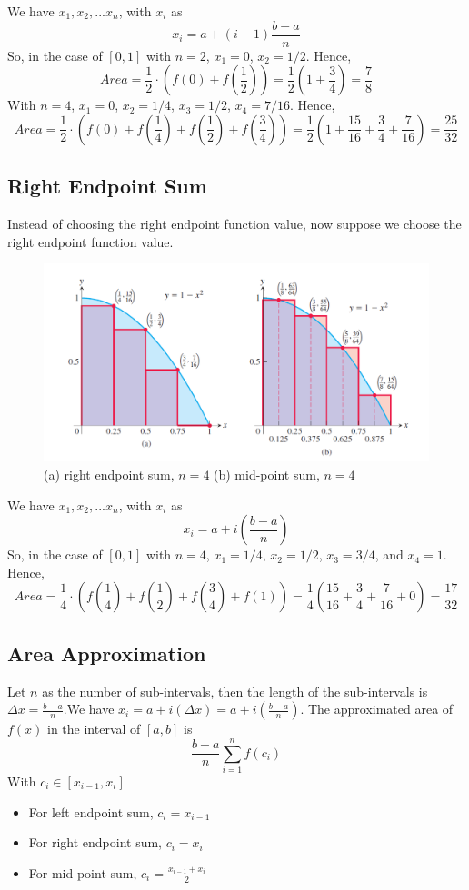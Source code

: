 \documentclass[12pt]{article}
\begin{document}
\noindent
We have $x_1, x_2, ... x_n$, with $x_i$ as 
\[
    x_i = a + (i - 1)\frac{b - a}{n} 
\]
So, in the case of $[0, 1]$ with $n = 2$, $x_1 = 0$, $x_2 = 1/2$.
Hence,
\[
    Area = \frac{1}{2} \cdot \left(f(0) + f\left(\frac{1}{2}\right)\right) = \frac{1}{2} \left(1 + \frac{3}{4}\right) = \frac{7}{8}
\]
With $n = 4$, $x_1 = 0$, $x_2 = 1/4$, $x_3 = 1/2$, $x_4 = 7/16$.
Hence,
\[
    Area = \frac{1}{2} \cdot \left(f(0) + f\left(\frac{1}{4}\right) + f\left(\frac{1}{2}\right) + f\left(\frac{3}{4}\right)\right) = \frac{1}{2} \left(1 + \frac{15}{16} + \frac{3}{4} + \frac{7}{16}\right) = \frac{25}{32}
\]

\subsection{Right Endpoint Sum}
Instead of choosing the right endpoint function value, now suppose we choose the right endpoint function value.
\begin{figure}[h!]
    \centering
    \includegraphics[width = 0.7\linewidth]{Images/right summing.png}
    \caption{(a) right endpoint sum, $n = 4$ (b) mid-point sum, $n = 4$}
\end{figure}

\noindent
We have $x_1, x_2, ... x_n$, with $x_i$ as 
\[
    x_i = a + i \left(\frac{b - a}{n} \right)
\]
So, in the case of $[0, 1]$ with $n = 4$, $x_1 = 1/4$, $x_2 = 1/2$, $x_3 = 3/4$, and $x_4 = 1$.
Hence,
\[
    Area = \frac{1}{4} \cdot \left(f\left(\frac{1}{4}\right) + f\left(\frac{1}{2}\right) + f\left(\frac{3}{4}\right) + f(1)\right) = \frac{1}{4} \left(\frac{15}{16} + \frac{3}{4} + \frac{7}{16} + 0 \right) = \frac{17}{32}
\]

\subsection{Area Approximation}
Let $n$ as the number of sub-intervals, then the length of the sub-intervals is $\Delta x = \frac{b - a}{n}$.We have 
$x_i = a + i(\Delta x) = a + i \left( \frac{b-a}{n} \right)$. The approximated area of $f(x)$ in the interval of $[a, b]$ is 
\[
    \frac{b - a}{n}\sum_{i = 1}^n f(c_i) 
\]
With $c_i \in [x_{i - 1}, x_i]$
\begin{itemize}
    \item For left endpoint sum, $c_i = x_{i - 1}$
    \item For right endpoint sum, $c_i = x_{i}$
    \item For mid point sum, $c_i = \frac{x_{i - 1} + x_{i}}{2}$
\end{itemize}
\end{document}
